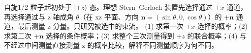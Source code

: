 自旋1/2 粒子起初处于 \(|+z\rangle\) 态。理想 Stern–Gerlach 装置先选择通过 \(+x\) 通道，再选择通过与 z 轴成角 \(\theta \)（在 xz 平面、方向 \(\boldsymbol n=(\sin\theta,0,\cos\theta)\)）的 \(+\boldsymbol n\) 通道，最后测量 z 分量。只研究被选中的束流。
(1) 求第一次 \(+x\) 选择的概率；(2) 求第二次 \(+\boldsymbol n\) 选择的条件概率；(3) 求整个三次测量得到 \(+z\) 的联合概率；(4) 与不经过中间测量直接测量 z 的概率比较，解释不同测量顺序为何不同。
